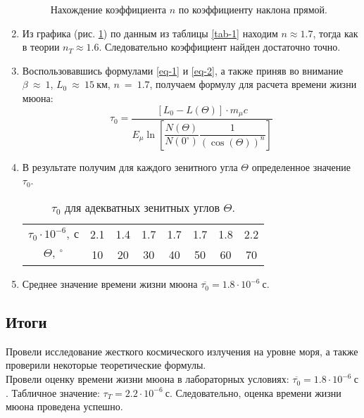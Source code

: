 \documentclass{lab}
\begin{document}
\begin{enumerate}
\begin{figure}[H]
	\caption{Нахождение коэффициента $ n $ по коэффициенту наклона прямой.}
	\label{g_1}
\end{figure}

\item 

Из графика (рис. \ref{g_1}) по данным из таблицы \ref{tab-1} находим $ n \approx 1.7 $, тогда как в теории $ n_T \approx 1.6 $. Следовательно коэффициент найден достаточно точно.

\newpage

\item 
Воспользовавшись формулами \eqref{eq-1} и \eqref{eq-2}, а также приняв во внимание $ \beta~\approx~1 $, $ L_0~\approx~15~км $, $ n~=~1.7 $, получаем формулу для расчета времени жизни мюона:
\begin{equation}\label{eq-3}
\tau_0 = \dfrac{[L_0 - L(\Theta)] \cdot m_{\mu} c}{E_{\mu} \ln \left[\dfrac{N(\Theta)}{N(0^{\circ})} \dfrac{1}{(\cos (\Theta))^n}\right]}
\end{equation}

\item 
В результате получим для каждого зенитного угла $ \Theta $ определенное значение $ \tau_0 $.

\begin{table}[H]
	\centering
	\begin{tabular}{|c|ccccccc|}
		\hline
		$ \tau_0 \cdot 10^{-6},~с $ & 2.1 & 1.4 & 1.7 & 1.7 & 1.7 & 1.8 & 2.2 \\
		$ \Theta,~^{\circ} $        & 10  & 20  & 30  & 40  & 50  & 60  & 70  \\ \hline
	\end{tabular}
	\caption{$ \tau_0 $ для адекватных зенитных углов $ \Theta $.}
	\label{tab-2}
\end{table}

\item 
Среднее значение времени жизни мюона $ \overline{\tau_0} = 1.8 \cdot 10^{-6}~с $.

\end{enumerate}

\subsection*{Итоги}

Провели исследование жесткого космического излучения на уровне моря, а также проверили некоторые теоретические формулы.\\

Провели оценку времени жизни мюона в лабораторных условиях: $ \overline{\tau_0} = 1.8 \cdot 10^{-6}~с $. Табличное значение: $ {\tau_T} = 2.2 \cdot 10^{-6}~с $. Следовательно, оценка времени жизни мюона проведена успешно.
\end{document}
